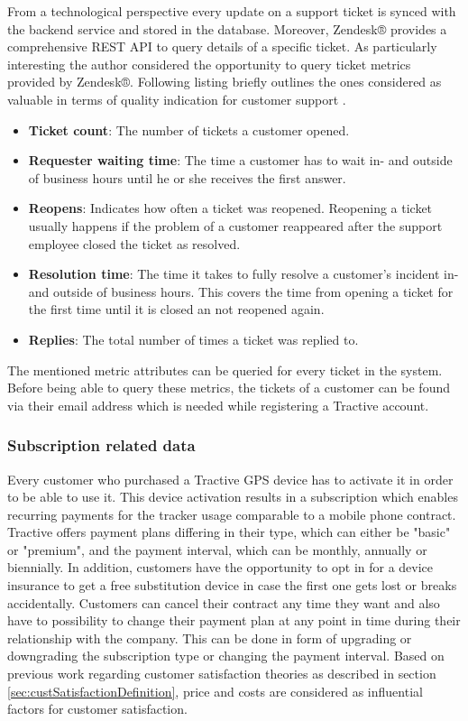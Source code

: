 From a technological perspective every update on a support ticket is synced with the backend service and stored in the database. Moreover, Zendesk® provides a comprehensive REST API to query details of a specific ticket. As particularly interesting the author considered the opportunity to query ticket metrics provided by Zendesk®. Following listing briefly outlines the ones considered as valuable in terms of quality indication for customer support \cite{zendeskWeb}.

\begin{itemize}
	\item \textbf{Ticket count}: The number of tickets a customer opened.
	\item \textbf{Requester waiting time}: The time a customer has to wait in- and outside of business hours until he or she receives the first answer.
	\item \textbf{Reopens}: Indicates how often a ticket was reopened. Reopening a ticket usually happens if the problem of a customer reappeared after the support employee closed the ticket as resolved.
	\item \textbf{Resolution time}: The time it takes to fully resolve a customer's incident in- and outside of business hours. This covers the time from opening a ticket for the first time until it is closed an not reopened again. 
	\item \textbf{Replies}: The total number of times a ticket was replied to.
\end{itemize}

The mentioned metric attributes can be queried for every ticket in the system. Before being able to query these metrics, the tickets of a customer can be found via their email address which is needed while registering a Tractive account. 

\subsubsection{Subscription related data}
Every customer who purchased a Tractive GPS device has to activate it in order to be able to use it. This device activation results in a subscription which enables recurring payments for the tracker usage comparable to a mobile phone contract. Tractive offers payment plans differing in their type, which can either be "basic" or "premium", and the payment interval, which can be monthly, annually or biennially. In addition, customers have the opportunity to opt in for a device insurance to get a free substitution device in case the first one gets lost or breaks accidentally. Customers can cancel their contract any time they want and also have to possibility to change their payment plan at any point in time during their relationship with the company. This can be done in form of upgrading or downgrading the subscription type or changing the payment interval. Based on previous work regarding customer satisfaction theories as described in section \ref{sec:custSatisfactionDefinition}, price and costs are considered as influential factors for customer satisfaction. 

